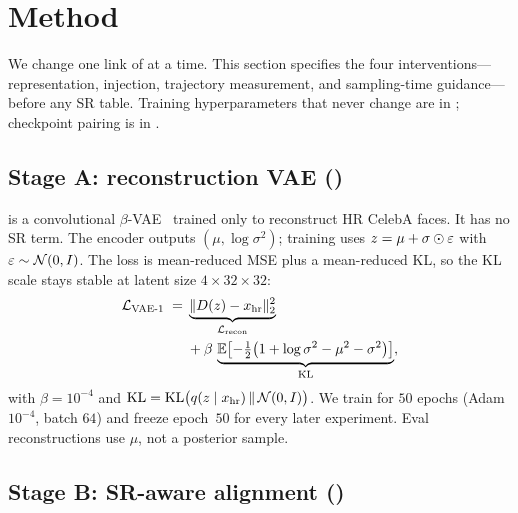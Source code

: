 \section{Method}
\label{sec:method}

We change one link of  at a time.
This section specifies the four interventions---representation,
injection, trajectory measurement, and sampling-time
guidance---before any SR table.
Training hyperparameters that never change are in
; checkpoint pairing is in .

\subsection{Stage A: reconstruction VAE (\vaeone)}
\label{sec:method-vae1}

\vaeone{} is a convolutional $\beta$-VAE~\citep{kingma2014auto}
trained only to reconstruct HR CelebA faces.
It has no SR term.
The encoder outputs $(\mu,\log\sigma^2)$; training uses
$z=\mu+\sigma\odot\varepsilon$ with $\varepsilon\sim\mathcal{N}(0,I)$.
The loss is mean-reduced MSE plus a mean-reduced KL, so the KL
scale stays stable at latent size $4\times 32\times 32$:
\begin{equation}
  \label{eq:vae1}
  \begin{aligned}
    \mathcal{L}_{\mathrm{VAE\text{-}1}}
    \;=\;
    &\underbrace{\lVert D(z)-x_{\mathrm{hr}}\rVert_2^2}_{\mathcal{L}_{\mathrm{recon}}} \\
    &+\beta\,
    \underbrace{\mathbb{E}\bigl[-\tfrac12\bigl(1+\log\sigma^2-\mu^2-\sigma^2\bigr)\bigr]
    }_{\mathrm{KL}},
  \end{aligned}
\end{equation}
with $\beta=10^{-4}$ and
$\mathrm{KL}=\mathrm{KL}\bigl(q(z\mid x_{\mathrm{hr}})\,\Vert\,\mathcal{N}(0,I)\bigr)$.
We train for $50$ epochs (Adam $10^{-4}$, batch $64$) and freeze
epoch~$50$ for every later experiment.
Eval reconstructions use $\mu$, not a posterior sample.

\subsection{Stage B: SR-aware alignment (\vaesr)}
\label{sec:method-vaesr}

